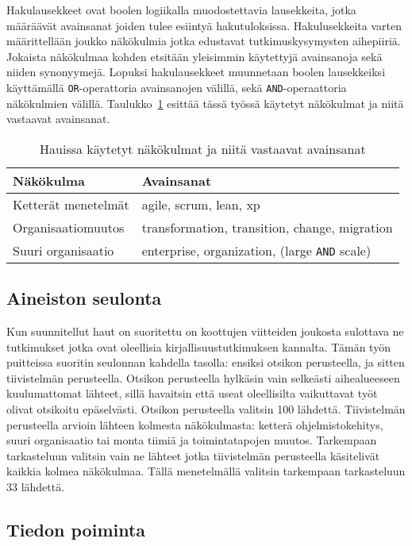 Hakulausekkeet ovat boolen logiikalla muodostettavia lausekkeita, jotka
määräävät avainsanat joiden tulee esiintyä hakutuloksissa. Hakulusekkeita varten
määrittellään joukko näkökulmia jotka edustavat tutkimuskysymysten aihepiiriä.
Jokaista näkökulmaa kohden etsitään yleisimmin käytettyjä avainsanoja sekä
niiden synonyymejä. Lopuksi hakulausekkeet muunnetaan boolen lausekkeiksi
käyttämällä \texttt{OR}-operattoria avainsanojen välillä, sekä
\texttt{AND}-operaattoria näkökulmien välillä.
Taulukko~\ref{table:hakulausekkeet} esittää tässä työssä käytetyt näkökulmat ja
niitä vastaavat avainsanat.

\begin{table}
    \begin{tabular}{|l|l|}
        \hline
        Näkökulma           & Avainsanat   \\ \hline
        Ketterät menetelmät & agile, scrum, lean, xp \\ 
        Organisaatiomuutos  & transformation, transition, change, migration \\
        Suuri organisaatio  & enterprise, organization, (large \texttt{AND} scale) \\
        \hline
    \end{tabular}
	\caption{Hauissa käytetyt näkökulmat ja niitä vastaavat avainsanat}
	\label{table:hakulausekkeet}
\end{table}

\subsection{Aineiston seulonta}

Kun suunnitellut haut on suoritettu on koottujen viitteiden joukosta sulottava
ne tutkimukset jotka ovat oleellisia kirjallisuustutkimuksen kannalta. Tämän
työn puitteissa suoritin seulonnan kahdella tasolla: ensiksi otsikon
perusteella, ja sitten tiivistelmän perusteella. Otsikon perusteella hylkäsin
vain selkeästi aihealueeseen kuulumattomat lähteet, sillä havaitsin että useat
oleellisilta vaikuttavat työt olivat otsikoitu epäselvästi. Otsikon perusteella
valitsin 100 lähdettä. Tiivistelmän perusteella arvioin lähteen kolmesta
näkökulmasta: ketterä ohjelmistokehitys, suuri organisaatio tai monta tiimiä ja
toimintatapojen muutos. Tarkempaan tarkasteluun valitsin vain ne lähteet jotka
tiivistelmän perusteella käsitelivät kaikkia kolmea näkökulmaa. Tällä
menetelmällä valitsin tarkempaan tarkasteluun 33 lähdettä.

\subsection{Tiedon poiminta}

